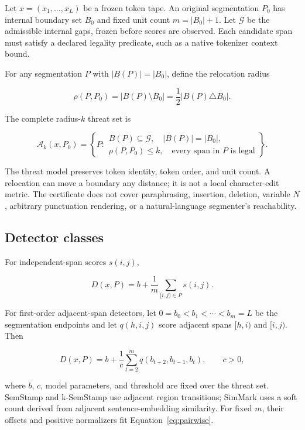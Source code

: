 \documentclass[10pt]{article}
\begin{document}
Let $x=(x_1,\ldots,x_L)$ be a frozen token tape. An original segmentation
$P_0$ has internal boundary set $B_0$ and fixed unit count
$m=|B_0|+1$. Let $\mathcal G$ be the admissible internal gaps, frozen before
scores are observed. Each candidate span must satisfy a declared legality
predicate, such as a native tokenizer context bound.

For any segmentation $P$ with $|B(P)|=|B_0|$, define the relocation radius

\begin{equation}
\rho(P,P_0)=|B(P)\setminus B_0|
           =\frac{1}{2}|B(P)\triangle B_0|.
\end{equation}

The complete radius-$k$ threat set is

\begin{equation}
\mathcal A_k(x,P_0)=
\left\{P:
\begin{array}{l}
B(P)\subseteq\mathcal G,\quad |B(P)|=|B_0|,\\
\rho(P,P_0)\leq k,\quad
\text{every span in }P\text{ is legal}
\end{array}
\right\}.
\label{eq:threat}
\end{equation}

The threat model preserves token identity, token order, and unit count. A
relocation can move a boundary any distance; it is not a local character-edit
metric. The certificate does not cover paraphrasing, insertion, deletion,
variable $N$, arbitrary punctuation rendering, or a natural-language
segmenter's reachability.

\subsection{Detector classes}

For independent-span scores $s(i,j)$,

\begin{equation}
D(x,P)=b+\frac{1}{m}\sum_{[i,j)\in P}s(i,j).
\end{equation}

For first-order adjacent-span detectors, let
$0=b_0<b_1<\cdots<b_m=L$ be the segmentation endpoints and let
$q(h,i,j)$ score adjacent spans $[h,i)$ and $[i,j)$. Then

\begin{equation}
D(x,P)=b+\frac{1}{c}
\sum_{t=2}^{m}q(b_{t-2},b_{t-1},b_t),\qquad c>0,
\label{eq:pairwise}
\end{equation}

where $b$, $c$, model parameters, and threshold are fixed over the threat set.
SemStamp and k-SemStamp use adjacent region transitions; SimMark uses a soft
count derived from adjacent sentence-embedding similarity. For fixed $m$,
their offsets and positive normalizers fit Equation~\ref{eq:pairwise}.
\end{document}

